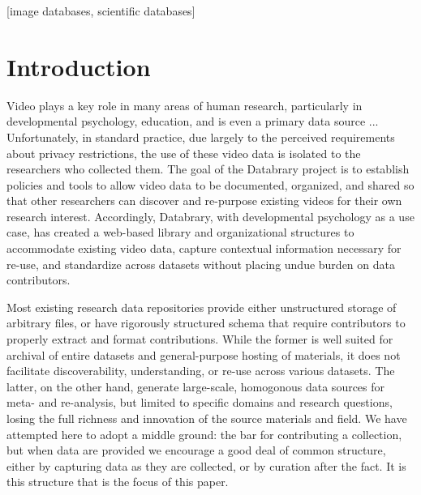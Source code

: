 \documentclass{sig-alternate}
\begin{document}
[image
databases, scientific databases]



\section{Introduction}

Video plays a key role in many areas of human research, particularly in developmental psychology, education, and is even a primary data source ...
Unfortunately, in standard practice, due largely to the perceived requirements about privacy restrictions, the use of these video data is isolated to the researchers who collected them.
The goal of the Databrary project is to establish policies and tools to allow video data to be documented, organized, and shared so that other researchers can discover and re-purpose existing videos for their own research interest.
Accordingly, Databrary, with developmental psychology as a use case, has created a web-based library and organizational structures to accommodate existing video data, capture contextual information necessary for re-use, and standardize across datasets without placing undue burden on data contributors.

Most existing research data repositories provide either unstructured storage of arbitrary files, or have rigorously structured schema that require contributors to properly extract and format contributions.
While the former is well suited for archival of entire datasets and general-purpose hosting of materials, it does not facilitate discoverability, understanding, or re-use across various datasets.
The latter, on the other hand, generate large-scale, homogonous data sources for meta- and re-analysis, but limited to specific domains and research questions, losing the full richness and innovation of the source materials and field.
We have attempted here to adopt a middle ground: the bar for contributing a collection, but when data are provided we encourage a good deal of common structure, either by capturing data as they are collected, or by curation after the fact.
It is this structure that is the focus of this paper.
\end{document}
